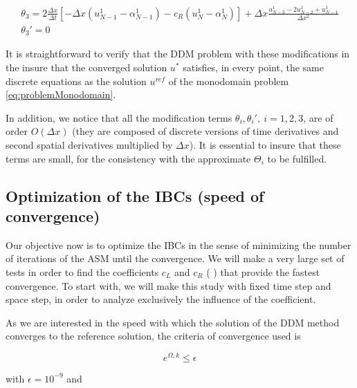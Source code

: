 \begin{equation*}
\begin{gathered}
    \theta_3 = 2\frac{\Delta x}{\Delta t} \left[-\Delta x(u_{N-1}^1 - \alpha_{N-1}^1) - c_R (u_N^1 - \alpha_N^1) \right] + \Delta x \frac{u_{N-3}^1 - 2u_{N-2}^1 + u_{N-1}^1}{\Delta x^2} \\
    \theta_3' = 0
\end{gathered}
\end{equation*}

\indent It is straightforward to verify that the DDM problem with these modifications in the   insure that the converged solution $u^*$ satisfies, in every point, the same discrete equations as the solution $u^{ref}$ of the monodomain problem \eqref{eq:problemMonodomain}.

\indent In addition, we notice that all the modification terms $\theta_i,\theta_i', \ i = 1,2,3$, are of order $O(\Delta x)$ (they are composed of discrete versions of time derivatives and second spatial derivatives multiplied by $\Delta x$). It is essential to insure that these terms are small, for the consistency with the approximate   $\Theta_i$ to be fulfilled.

\subsection{Optimization of the IBCs (speed of convergence)}

\indent Our objective now is to optimize the IBCs in the sense of minimizing the number of iterations of the ASM until the convergence. We will make a very large set of tests in order to find the coefficients $c_L$ and $c_R$ ( ) that provide the fastest convergence. To start with, we will make this study with fixed time step and space step, in order to analyze exclusively the influence of the coefficient.

\indent As we are interested in the speed with which the solution of the DDM method converges to the reference solution, the criteria of convergence used is

\begin{equation*}
	e^{\Omega,k} \leq \epsilon
\end{equation*}

\noindent with $\epsilon = 10^{-9}$ and 

